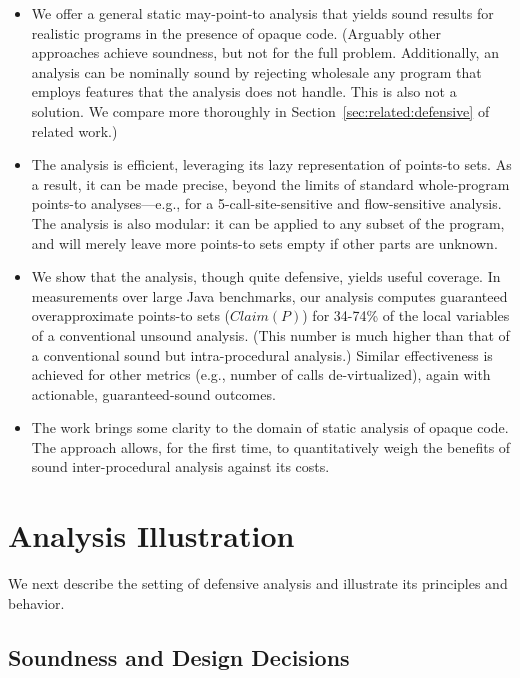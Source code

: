 \begin{itemize}
\item We offer a general static may-point-to analysis that yields sound results for realistic programs in the presence of opaque code. (Arguably other approaches \cite{ecoop:2004:Hirzel,article:2007:Hirzel,pldi:2007:Lattner} achieve soundness, but not for the full problem. Additionally, an analysis can be nominally sound by rejecting wholesale any program that employs features that the analysis does not handle. This is also not a solution. We compare more thoroughly in Section~\ref{sec:related:defensive} of related work.)

\item The analysis is efficient, leveraging its lazy representation of points-to sets. As a result, it can be made precise, beyond the limits of standard whole-program points-to analyses---e.g., for a 5-call-site-sensitive and flow-sensitive analysis. The analysis is also modular: it can be applied to any subset of the program, and will merely leave more points-to sets empty if other parts are unknown.
  
\item We show that the analysis, though quite defensive, yields useful coverage. In measurements over large Java benchmarks, our analysis computes guaranteed overapproximate points-to sets ($Claim(P)$) for 34-74\% of the local variables of a conventional unsound analysis. (This number is much higher than that of a conventional sound but intra-procedural analysis.) Similar effectiveness is achieved for other metrics (e.g., number of calls de-virtualized), again with actionable, guaranteed-sound outcomes.

\item The work brings some clarity to the domain of static analysis of opaque code. The approach allows, for the first time, to quantitatively weigh the benefits of sound inter-procedural analysis against its costs.
\end{itemize}


\section{Analysis Illustration}

We next describe the setting of defensive analysis and illustrate its principles and behavior.

\subsection{Soundness and Design Decisions}

